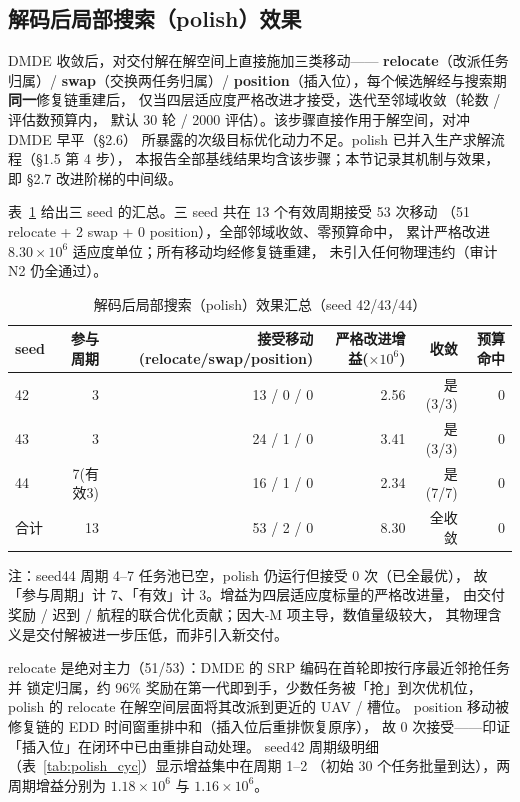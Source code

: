 \documentclass[a4paper,11pt]{article}
\begin{document}
\subsection{解码后局部搜索（polish）效果}
\label{sec:polish}

DMDE 收敛后，对交付解在解空间上直接施加三类移动——
\textbf{relocate}（改派任务归属）/ \textbf{swap}（交换两任务归属）/
\textbf{position}（插入位），每个候选解经与搜索期\textbf{同一}修复链重建后，
仅当四层适应度严格改进才接受，迭代至邻域收敛（轮数 / 评估数预算内，
默认 30 轮 / 2000 评估）。该步骤直接作用于解空间，对冲 DMDE 早平（\S 2.6）
所暴露的次级目标优化动力不足。polish 已并入生产求解流程（\S 1.5 第 4 步），
本报告全部基线结果均含该步骤；本节记录其机制与效果，即 \S 2.7 改进阶梯的中间级。

表~\ref{tab:polish} 给出三 seed 的汇总。三 seed 共在 13 个有效周期接受 53 次移动
（51 relocate + 2 swap + 0 position），全部邻域收敛、零预算命中，
累计严格改进 $8.30\times10^6$ 适应度单位；所有移动均经修复链重建，
未引入任何物理违约（审计 N2 仍全通过）。

\begin{table}[H]
\centering
\caption{解码后局部搜索（polish）效果汇总（seed 42/43/44）}
\label{tab:polish}
\small
\begin{tabular}{lrrrrr}
\toprule
seed & 参与周期 & 接受移动(relocate/swap/position) & 严格改进增益($\times10^6$) & 收敛 & 预算命中 \\
\midrule
42  & 3        & 13 / 0 / 0    & 2.56 & 是(3/3) & 0 \\
43  & 3        & 24 / 1 / 0    & 3.41 & 是(3/3) & 0 \\
44  & 7(有效3) & 16 / 1 / 0    & 2.34 & 是(7/7) & 0 \\
\midrule
合计 & 13 & 53 / 2 / 0 & 8.30 & 全收敛 & 0 \\
\bottomrule
\end{tabular}
\end{table}

注：seed44 周期 4--7 任务池已空，polish 仍运行但接受 0 次（已全最优），
故「参与周期」计 7、「有效」计 3。增益为四层适应度标量的严格改进量，
由交付奖励 / 迟到 / 航程的联合优化贡献；因大-M 项主导，数值量级较大，
其物理含义是交付解被进一步压低，而非引入新交付。

relocate 是绝对主力（51/53）：DMDE 的 SRP 编码在首轮即按行序最近邻抢任务并
锁定归属，约 96\% 奖励在第一代即到手，少数任务被「抢」到次优机位，
polish 的 relocate 在解空间层面将其改派到更近的 UAV / 槽位。
position 移动被修复链的 EDD 时间窗重排中和（插入位后重排恢复原序），
故 0 次接受——印证「插入位」在闭环中已由重排自动处理。
seed42 周期级明细（表~\ref{tab:polish_cyc}）显示增益集中在周期 1--2
（初始 30 个任务批量到达），两周期增益分别为 $1.18\times10^6$ 与 $1.16\times10^6$。
\end{document}

